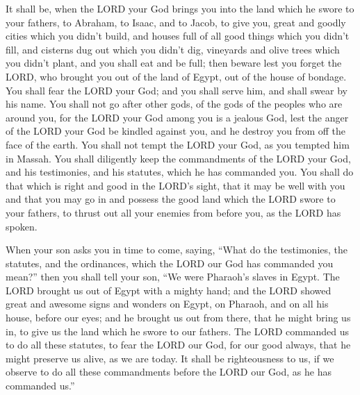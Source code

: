 	
	\myverse{}It shall be, when the LORD your God brings you into the land
	which he swore to your fathers, to Abraham, to Isaac, and to Jacob, to give you, great and goodly cities
	which you didn’t build,
	\myverse{}and houses full of all good things which you didn’t fill, and cisterns dug
	out which you didn’t dig, vineyards and olive trees which you didn’t plant, and you shall eat and be full;
	\myverse{}then beware lest you forget the LORD, who brought you out of the land of Egypt,
	out of the house of bondage.
	\myverse{}You shall fear the LORD your God; and you shall serve him, and shall swear
	by his name.
	\myverse{}You shall not go after other gods, of the gods of the peoples who are around
	you,
	\myverse{}for the LORD your God among you is a jealous God, lest the anger of the LORD
	your God be kindled against you, and he destroy you from off the face of the earth.
	\myverse{}You shall not tempt the LORD your God, as you tempted him in Massah.
	\myverse{}You shall diligently keep the commandments of the LORD your God, and his testimonies,
	and his statutes, which he has commanded you.
	\myverse{}You shall do that which is right and good in the LORD’s sight, that it may
	be well with you and that you may go in and possess the good land which the LORD swore to your fathers,
	\myverse{}to thrust out all your enemies from before you, as the LORD has spoken.
	
	
	\myverse{}When your son asks you in time to come, saying, “What do the
	testimonies, the statutes, and the ordinances, which the LORD our God has commanded you mean?”
	\myverse{}then you shall tell your son, “We were Pharaoh’s slaves in Egypt. The LORD
	brought us out of Egypt with a mighty hand;
	\myverse{}and the LORD showed great and awesome signs and wonders on Egypt, on Pharaoh,
	and on all his house, before our eyes;
	\myverse{}and he brought us out from there, that he might bring us in, to give us the
	land which he swore to our fathers.
	\myverse{}The LORD commanded us to do all these statutes, to fear the LORD our God,
	for our good always, that he might preserve us alive, as we are today.
	\myverse{}It shall be righteousness to us, if we observe to do all these commandments
	before the LORD our God, as he has commanded us.”
	
